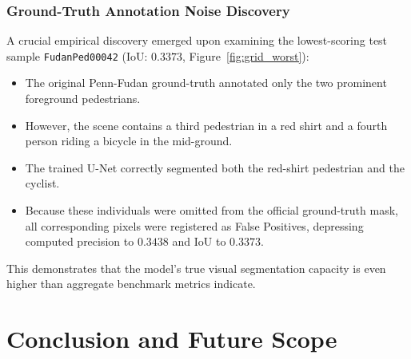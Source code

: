 \documentclass[10pt,a4paper]{report}
\begin{document}
\subsection{Ground-Truth Annotation Noise Discovery}
A crucial empirical discovery emerged upon examining the lowest-scoring test sample \texttt{FudanPed00042} (IoU: $0.3373$, Figure~\ref{fig:grid_worst}):
\begin{itemize}
    \item The original Penn-Fudan ground-truth annotated only the two prominent foreground pedestrians.
    \item However, the scene contains a third pedestrian in a red shirt and a fourth person riding a bicycle in the mid-ground.
    \item The trained U-Net correctly segmented both the red-shirt pedestrian and the cyclist.
    \item Because these individuals were omitted from the official ground-truth mask, all corresponding pixels were registered as False Positives, depressing computed precision to $0.3438$ and IoU to $0.3373$.
\end{itemize}
This demonstrates that the model's true visual segmentation capacity is even higher than aggregate benchmark metrics indicate.

\chapter{Conclusion and Future Scope}
\label{chap:conclusion}
\end{document}
